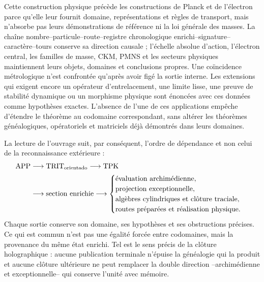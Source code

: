 Cette construction physique précède les constructions de Planck et de l'électron
parce qu'elle leur fournit domaine, représentations et règles de transport, mais
n'absorbe pas leurs démonstrations de référence ni la loi générale des masses. La
chaîne nombre--particule--route--registre chronologique enrichi--signature--
caractère--tours conserve sa direction causale ; l'échelle absolue d'action,
l'électron central, les familles de masse, CKM, PMNS et les secteurs physiques
maintiennent leurs objets, domaines et conclusions propres. Une coïncidence métrologique n'est
confrontée qu'après avoir figé la sortie interne. Les extensions qui
exigent encore un opérateur d'entrelacement, une limite lisse, une preuve de stabilité dynamique
ou un morphisme physique sont énoncées avec ces données comme hypothèses exactes.
L'absence de l'une de ces applications empêche d'étendre le théorème au codomaine
correspondant, sans altérer les théorèmes généalogiques, opératoriels et
matriciels déjà démontrés dans leurs domaines.

La lecture de l'ouvrage suit, par conséquent, l'ordre de dépendance et non
celui de la reconnaissance extérieure :
\[
\begin{aligned}
 \mathrm{APP}&\longrightarrow\mathrm{TRIT}_{\rm orientado}
 \longrightarrow\mathrm{TPK}\\
 &\longrightarrow\text{section enrichie}
 \longrightarrow
 \begin{cases}
  \text{évaluation archimédienne},\\
  \text{projection exceptionnelle},\\
  \text{algèbres cylindriques et clôture traciale},\\
  \text{routes préparées et réalisation physique}.
 \end{cases}
\end{aligned}
\]
Chaque sortie conserve son domaine, ses hypothèses et ses obstructions précises. Ce qui est commun n'est pas
une égalité forcée entre codomaines, mais la provenance du même
état enrichi. Tel est le sens précis de la clôture holographique : aucune
publication terminale n'épuise la généalogie qui la produit et aucune clôture
ultérieure ne peut remplacer la double direction --archimédienne et exceptionnelle--
qui conserve l'unité avec mémoire.
